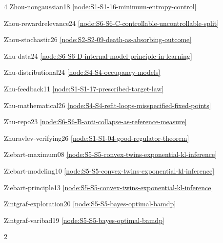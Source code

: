 \documentclass[10pt]{article}
\begin{document}
{\begin{multicols}{4}
Zhou-nongaussian18 \hfill \ref{node:S1-S1-16-minimum-entropy-control}\par
Zhou-rewardrelevance24 \hfill \ref{node:S6-S6-C-controllable-uncontrollable-split}\par
Zhou-stochastic26 \hfill \ref{node:S2-S2-09-death-as-absorbing-outcome}\par
Zhu-data24 \hfill \ref{node:S6-S6-D-internal-model-principle-in-learning}\par
Zhu-distributional24 \hfill \ref{node:S4-S4-occupancy-models}\par
Zhu-feedback11 \hfill \ref{node:S1-S1-17-prescribed-target-law}\par
Zhu-mathematical26 \hfill \ref{node:S4-S4-refit-loops-misspecified-fixed-points}\par
Zhu-repo23 \hfill \ref{node:S6-S6-B-anti-collapse-as-reference-measure}\par
Zhuravlev-verifying26 \hfill \ref{node:S1-S1-04-good-regulator-theorem}\par
Ziebart-maximum08 \hfill \ref{node:S5-S5-convex-twins-exponential-kl-inference}\par
Ziebart-modeling10 \hfill \ref{node:S5-S5-convex-twins-exponential-kl-inference}\par
Ziebart-principle13 \hfill \ref{node:S5-S5-convex-twins-exponential-kl-inference}\par
Zintgraf-exploration20 \hfill \ref{node:S5-S5-bayes-optimal-bamdp}\par
Zintgraf-varibad19 \hfill \ref{node:S5-S5-bayes-optimal-bamdp}\par
\end{multicols}}

{\begin{multicols}{2}


\end{multicols}}
\end{document}
